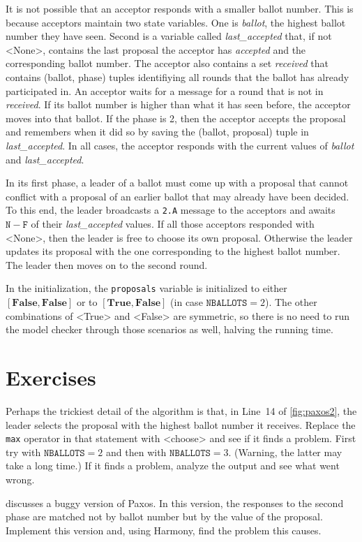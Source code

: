 \documentclass{report}
\begin{document}
{It is not possible that an acceptor responds with a smaller ballot
number.  This is because acceptors maintain two state variables.
One is \textit{ballot}, the highest ballot number they have seen.
Second is a variable called \textit{last\_accepted} that, if not
<{None}>, contains the last proposal the acceptor has
\emph{accepted} and the corresponding ballot number.  The acceptor
also contains a set \emph{received} that contains (ballot, phase)
tuples identifiying all rounds that the ballot has already participated
in.  An acceptor waits for a message for a round that is not in
\emph{received}.  If its ballot number is higher than what it has
seen before, the acceptor moves into that ballot.  If the phase is
2, then the acceptor accepts the proposal and remembers when it did
so by saving the (ballot, proposal) tuple in \textit{last\_accepted}.
In all cases, the acceptor responds with the current values of
\textit{ballot} and \textit{last\_accepted}.

In its first phase, a leader of a ballot must come up with a proposal that
cannot conflict with a proposal of an earlier ballot that may already
have been decided.  To this end, the leader broadcasts a \texttt{2.A}
message to the acceptors and awaits $\mathtt{N} - \mathtt{F}$ of their
\textit{last\_accepted}
values.  If all those acceptors responded with <{None}>, then the leader
is free to choose its own proposal.  Otherwise the leader updates
its proposal with the one corresponding to the highest ballot number.
The leader then moves on to the second round.

In the initialization, the \texttt{proposals} variable is initialized
to either $[\mathbf{False}, \mathbf{False}]$ or
to $[\mathbf{True}, \mathbf{False}]$ (in case $\texttt{NBALLOTS} = 2$).
The other combinations of <{True}> and <{False}> are symmetric,
so there is no need to run the model checker through those scenarios as
well, halving the running time.

\section*{Exercises}
\begin{problems}
\item Perhaps the trickiest detail of the algorithm is that, in Line~14
of \autoref{fig:paxos2}, the leader selects the proposal with the highest
ballot number it receives.  Replace the \texttt{max} operator in that statement
with <{choose}> and see if it finds a problem.  First try with
$\texttt{NBALLOTS} = 2$ and then with $\texttt{NBALLOTS} = 3$.
(Warning, the latter may take a long time.)  If it finds a problem,
analyze the output and see what went wrong.
\item \cite{MWA19} discusses a buggy version of Paxos.  In this version,
the responses to the second phase are matched not by ballot number but
by the value of the proposal.  Implement this version and, using Harmony,
find the problem this causes.
\end{problems}

}
\end{document}
